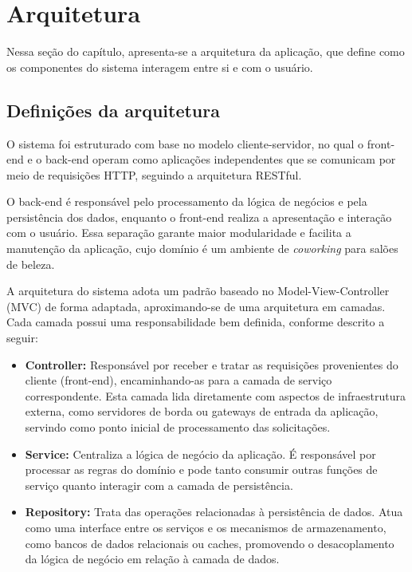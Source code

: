 \section{Arquitetura}

Nessa seção do capítulo, apresenta-se a arquitetura da aplicação, que define como os componentes do sistema interagem entre si e com o usuário.

\subsection{Definições da arquitetura}

O sistema foi estruturado com base no modelo cliente-servidor, no qual o front-end e o back-end operam como aplicações independentes que se comunicam por meio de requisições HTTP, seguindo a arquitetura RESTful.

O back-end é responsável pelo processamento da lógica de negócios e pela persistência dos dados, enquanto o front-end realiza a apresentação e interação com o usuário. Essa separação garante maior modularidade e facilita a manutenção da aplicação, cujo domínio é um ambiente de \textit{coworking} para salões de beleza.

A arquitetura do sistema adota um padrão baseado no Model-View-Controller (MVC) de forma adaptada, aproximando-se de uma arquitetura em camadas. Cada camada possui uma responsabilidade bem definida, conforme descrito a seguir:

\begin{itemize}
  \item \textbf{Controller:} Responsável por receber e tratar as requisições provenientes do cliente (front-end), encaminhando-as para a camada de serviço correspondente. Esta camada lida diretamente com aspectos de infraestrutura externa,  como servidores de borda ou gateways de entrada da aplicação, servindo como ponto inicial de processamento das solicitações.
  \item \textbf{Service:} Centraliza a lógica de negócio da aplicação. É responsável por processar as regras do domínio e pode tanto consumir outras funções de serviço quanto interagir com a camada de persistência.
  \item \textbf{Repository:} Trata das operações relacionadas à persistência de dados. Atua como uma interface entre os serviços e os mecanismos de armazenamento, como bancos de dados relacionais ou caches, promovendo o desacoplamento da lógica de negócio em relação à camada de dados.
\end{itemize}


